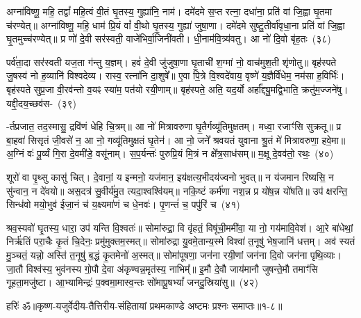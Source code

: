 अग्ना॑विष्णू॒ महि॒ तद्वां᳚ महि॒त्वं वी॒तं घृ॒तस्य॒ गुह्या॑नि॒ नाम॑। दमे॑दमे स॒प्त रत्ना॒ दधा॑ना॒ प्रति॑ वां जि॒ह्वा घृ॒तमा च॑रण्येत्॥ अग्ना॑विष्णू॒ महि॒ धाम॑ प्रि॒यं वां᳚ वी॒थो घृ॒तस्य॒ गुह्या॑ जुषा॒णा। दमे॑दमे सुष्टु॒तीर्वा॑वृधा॒ना प्रति॑ वां जि॒ह्वा घृ॒तमुच्च॑रण्येत्॥ प्र णो॑ दे॒वी सर॑स्वती॒ वाजे॑भिर्वा॒जिनी॑वती। धी॒नाम॑वि॒त्र्य॑वतु। आ नो॑ दि॒वो बृ॑ह॒तः~(३८)

पर्व॑ता॒दा सर॑स्वती यज॒ता ग॑न्तु य॒ज्ञम्। हवं॑ दे॒वी जु॑जुषा॒णा घृ॒ताची॑ श॒ग्मां नो॒ वाच॑मुश॒ती शृ॑णोतु॥ बृह॑स्पते जु॒षस्व॑ नो ह॒व्यानि॑ विश्वदेव्य। रास्व॒ रत्ना॑नि दा॒शुषे᳚॥ ए॒वा पि॒त्रे वि॒श्वदे॑वाय॒ वृष्णे॑ य॒ज्ञैर्वि॑धेम॒ नम॑सा ह॒विर्भिः॑। बृह॑स्पते सुप्र॒जा वी॒रव॑न्तो व॒यꣴ स्या॑म॒ पत॑यो रयी॒णाम्॥ बृह॑स्पते॒ अति॒ यद॒र्यो अर्\mbox{}हा᳚द्द्यु॒मद्वि॒भाति॒ क्रतु॑म॒ज्जने॑षु। यद्दी॒दय॒च्छव॑स-~(३९)

-र्तप्रजात॒ तद॒स्मासु॒ द्रवि॑णं धेहि चि॒त्रम्॥ आ नो॑ मित्रावरुणा घृ॒तैर्गव्यू॑तिमुक्षतम्। मध्वा॒ रजाꣳ॑सि सुक्रतू॥ प्र बा॒हवा॑ सिसृतं जी॒वसे॑ न॒ आ नो॒ गव्यू॑तिमुक्षतं घृ॒तेन॑। आ नो॒ जने᳚ श्रवयतं युवाना श्रु॒तं मे॑ मित्रावरुणा॒ हवे॒मा॥ अ॒ग्निं वः॑ पू॒र्व्यं गि॒रा दे॒वमी॑डे॒ वसू॑नाम्। स॒प॒र्यन्तः॑ पुरुप्रि॒यं मि॒त्रं न क्षे᳚त्र॒साध॑सम्॥ म॒क्षू दे॒वव॑तो॒ रथः॒~(४०)

शूरो॑ वा पृ॒थ्सु कासु॑ चित्। दे॒वानां॒ य इन्मनो॒ यज॑मान॒ इय॑क्षत्य॒भीदय॑ज्वनो भुवत्॥ न य॑जमान रिष्यसि॒ न सु॑न्वान॒ न दे॑वयो॥ अस॒दत्र॑ सु॒वीर्य॑मु॒त त्यदा॒श्वश्वि॑यम्॥ नकि॒ष्टं कर्म॑णा नश॒न्न प्र यो॑ष॒न्न यो॑षति॥ उप॑ क्षरन्ति॒ सिन्ध॑वो मयो॒भुव॑ ईजा॒नं च॑ य॒क्ष्यमा॑णं च धे॒नवः॑। पृ॒णन्तं॑ च॒ पपु॑रिं च~(४१)

श्रव॒स्यवो॑ घृ॒तस्य॒ धारा॒ उप॑ यन्ति वि॒श्वतः॑॥ सोमा॑रुद्रा॒ वि वृ॑हतं॒ विषू॑ची॒ममी॑वा॒ या नो॒ गय॑मावि॒वेश॑। आ॒रे बा॑धेथां॒ निर्\mbox{}ऋ॑तिं परा॒चैः कृ॒तं चि॒देनः॒ प्रमु॑मुक्तम॒स्मत्॥ सोमा॑रुद्रा यु॒वमे॒तान्य॒स्मे विश्वा॑ त॒नूषु॑ भेष॒जानि॑ धत्तम्। अव॑ स्यतं मु॒ञ्चतं॒ यन्नो॒ अस्ति॑ त॒नूषु॑ ब॒द्धं कृ॒तमेनो॑ अ॒स्मत्॥ सोमा॑पूषणा॒ जन॑ना रयी॒णां जन॑ना दि॒वो जन॑ना पृथि॒व्याः। जा॒तौ विश्व॑स्य॒ भुव॑नस्य गो॒पौ दे॒वा अ॑कृण्वन्न॒मृत॑स्य॒ नाभिम्᳚॥ इ॒मौ दे॒वौ जाय॑मानौ जुषन्ते॒मौ तमाꣳ॑सि गूहता॒मजु॑ष्टा। आ॒भ्यामिन्द्रः॑ प॒क्वमा॒मास्व॒न्तः सो॑मापू॒ष\-भ्यां᳚ जनदु॒स्रिया॑सु॥~(४२)

{\anuvakamend[{बृ॒ह॒तः शव॑सा॒ रथः॒ पपु॑रिं च दि॒वो जन॑ना॒ पञ्च॑विꣳशतिश्च}]}%

{हरिः॑ ॐ}{॥कृष्ण-यजुर्वेदीय-तैत्तिरीय-संहितायां प्रथमकाण्डे अष्टमः प्रश्नः समाप्तः॥१-८॥}

